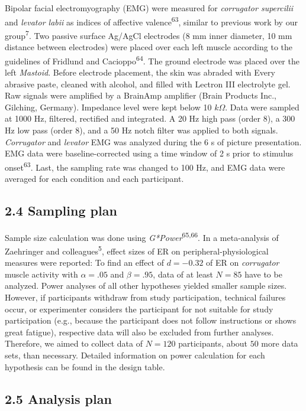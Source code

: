 \documentclass[
  man,floatsintext]{apa6}
\begin{document}
Bipolar facial electromyography (EMG) were measured for \emph{corrugator supercilii} and \emph{levator labii} as indices of affective valence\textsuperscript{63}, similar to previous work by our group\textsuperscript{7}.
Two passive surface Ag/AgCl electrodes (8 mm inner diameter, 10 mm distance between electrodes) were placed over each left muscle according to the guidelines of Fridlund and Cacioppo\textsuperscript{64}.
The ground electrode was placed over the left \emph{Mastoid}.
Before electrode placement, the skin was abraded with Every abrasive paste, cleaned with alcohol, and filled with Lectron III electrolyte gel.
Raw signals were amplified by a BrainAmp amplifier (Brain Products Inc., Gilching, Germany).
Impedance level were kept below 10 \(k\Omega\).
Data were sampled at 1000 Hz, filtered, rectified and integrated.
A 20 Hz high pass (order 8), a 300 Hz low pass (order 8), and a 50 Hz notch filter was applied to both signals.
\emph{Corrugator} and \emph{levator} EMG was analyzed during the 6 s of picture presentation.
EMG data were baseline-corrected using a time window of 2 s prior to stimulus onset\textsuperscript{63}.
Last, the sampling rate was changed to 100 Hz, and EMG data were averaged for each condition and each participant.

\hypertarget{sampling-plan}{%
\subsection{2.4 Sampling plan}\label{sampling-plan}}

Sample size calculation was done using \emph{G*Power}\textsuperscript{65,66}.
In a meta-analysis of Zaehringer and colleagues\textsuperscript{5}, effect sizes of ER on peripheral-physiological measures were reported:
To find an effect of \(d=-0.32\) of ER on \emph{corrugator} muscle activity with \(\alpha=.05\) and \(\beta=.95\), data of at least \(N=85\) have to be analyzed.
Power analyses of all other hypotheses yielded smaller sample sizes.
However, if participants withdraw from study participation, technical failures occur, or experimenter considers the participant for not suitable for study participation (e.g., because the participant does not follow instructions or shows great fatigue), respective data will also be excluded from further analyses.
Therefore, we aimed to collect data of \(N=120\) participants, about \(50%
\) more data sets, than necessary.
Detailed information on power calculation for each hypothesis can be found in the design table.

\hypertarget{analysis-plan}{%
\subsection{2.5 Analysis plan}\label{analysis-plan}}
\end{document}
